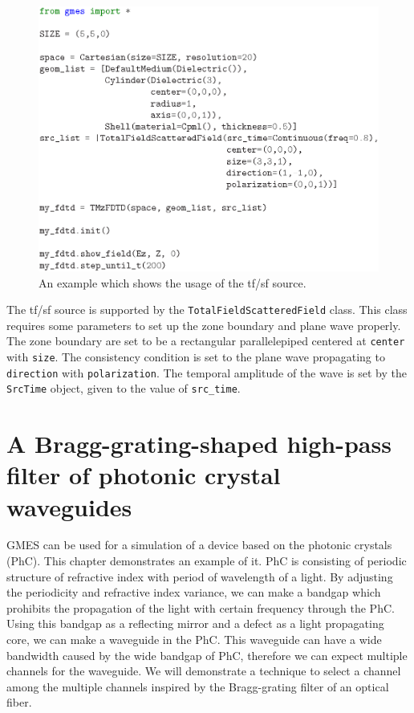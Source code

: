 \begin{figure}
  \includegraphics{figure/tfsf_ex_code}
  \caption{An example which shows the usage of the tf/sf source.}
  \label{fig:tfsf_ex_code}
\end{figure}

The tf/sf source is supported by the \texttt{TotalFieldScatteredField} class. This class requires some parameters to set up the zone boundary and plane wave properly. The zone boundary are set to be a rectangular parallelepiped centered at \texttt{center} with \texttt{size}. The consistency condition is set to the plane wave propagating to \texttt{direction} with \texttt{polarization}. The temporal amplitude of the wave is set by the \texttt{SrcTime} object, given to the value of \texttt{src\_time}.

\section{A Bragg-grating-shaped high-pass filter of photonic crystal waveguides}
GMES can be used for a simulation of a device based on the photonic crystals (PhC). This chapter demonstrates an example of it. PhC is consisting of periodic structure of refractive index with period of wavelength of a light. By adjusting the periodicity and refractive index variance, we can make a bandgap which prohibits the propagation of the light with certain frequency through the PhC. Using this bandgap as a reflecting mirror and a defect as a light propagating core, we can make a waveguide in the PhC. This waveguide can have a wide bandwidth caused by the wide bandgap of PhC, therefore we can expect multiple channels for the waveguide. We will demonstrate a technique to select a channel among the multiple channels inspired by the Bragg-grating filter of an optical fiber.

